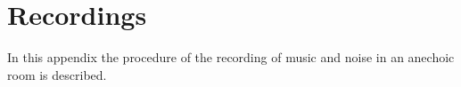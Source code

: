 \chapter{Recordings}
In this appendix the procedure of the recording of music and noise in an anechoic room is described.

